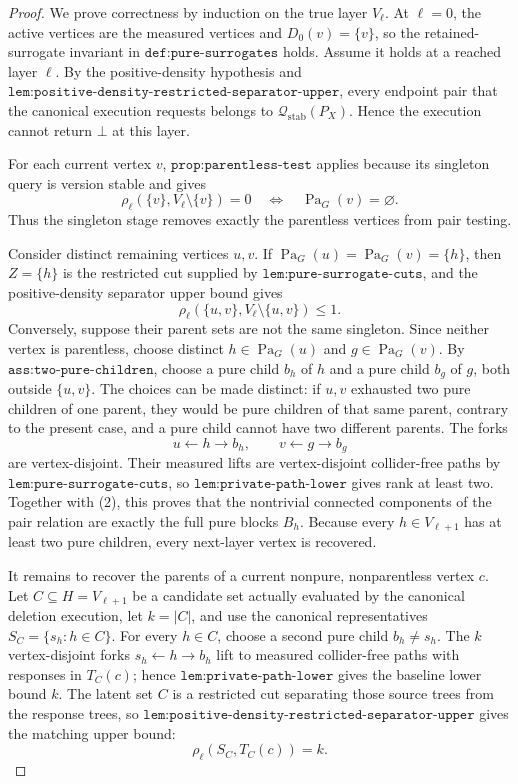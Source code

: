 \documentclass{article}
\begin{document}
\begin{proof}
We prove correctness by induction on the true layer \(V_\ell\).  At \(\ell=0\), the active vertices are the measured vertices and \(D_0(v)=\{v\}\), so the retained-surrogate invariant in \(\texttt{def:pure-surrogates}\) holds.  Assume it holds at a reached layer \(\ell\).  By the positive-density hypothesis and \(\texttt{lem:positive-density-restricted-separator-upper}\), every endpoint pair that the canonical execution requests belongs to \(\mathcal Q_{\mathrm{stab}}(P_X)\).  Hence the execution cannot return \(\bot\) at this layer.

For each current vertex \(v\), \(\texttt{prop:parentless-test}\) applies because its singleton query is version stable and gives
\[
 \rho_\ell(\{v\},V_\ell\setminus\{v\})=0
 \quad\Longleftrightarrow\quad
 \operatorname{Pa}_G(v)=\varnothing. \tag{1}
\]
Thus the singleton stage removes exactly the parentless vertices from pair testing.

Consider distinct remaining vertices \(u,v\).  If \(\operatorname{Pa}_G(u)=\operatorname{Pa}_G(v)=\{h\}\), then \(Z=\{h\}\) is the restricted cut supplied by \(\texttt{lem:pure-surrogate-cuts}\), and the positive-density separator upper bound gives
\[
 \rho_\ell(\{u,v\},V_\ell\setminus\{u,v\})\leq1. \tag{2}
\]
Conversely, suppose their parent sets are not the same singleton.  Since neither vertex is parentless, choose distinct \(h\in\operatorname{Pa}_G(u)\) and \(g\in\operatorname{Pa}_G(v)\).  By \(\texttt{ass:two-pure-children}\), choose a pure child \(b_h\) of \(h\) and a pure child \(b_g\) of \(g\), both outside \(\{u,v\}\).  The choices can be made distinct: if \(u,v\) exhausted two pure children of one parent, they would be pure children of that same parent, contrary to the present case, and a pure child cannot have two different parents.  The forks
\[
 u\leftarrow h\to b_h,
 \qquad
 v\leftarrow g\to b_g
\]
are vertex-disjoint.  Their measured lifts are vertex-disjoint collider-free paths by \(\texttt{lem:pure-surrogate-cuts}\), so \(\texttt{lem:private-path-lower}\) gives rank at least two.  Together with (2), this proves that the nontrivial connected components of the pair relation are exactly the full pure blocks \(B_h\).  Because every \(h\in V_{\ell+1}\) has at least two pure children, every next-layer vertex is recovered.

It remains to recover the parents of a current nonpure, nonparentless vertex \(c\).  Let \(C\subseteq H=V_{\ell+1}\) be a candidate set actually evaluated by the canonical deletion execution, let \(k=|C|\), and use the canonical representatives \(S_C=\{s_h:h\in C\}\).  For every \(h\in C\), choose a second pure child \(b_h\neq s_h\).  The \(k\) vertex-disjoint forks \(s_h\leftarrow h\to b_h\) lift to measured collider-free paths with responses in \(T_C(c)\); hence \(\texttt{lem:private-path-lower}\) gives the baseline lower bound \(k\).  The latent set \(C\) is a restricted cut separating those source trees from the response trees, so \(\texttt{lem:positive-density-restricted-separator-upper}\) gives the matching upper bound:
\[
 \rho_\ell(S_C,T_C(c))=k. \tag{3}
\]


\end{proof}
\end{document}

